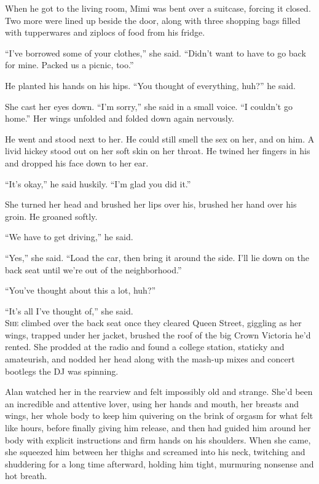 \documentclass{article}
\begin{document}
When he got to the living room, Mimi was bent over a suitcase, forcing
it closed.  Two more were lined up beside the door, along with three
shopping bags filled with tupperwares and ziplocs of food from his
fridge.

``I've borrowed some of your clothes,'' she said.  ``Didn't want to
have to go back for mine.  Packed us a picnic, too.''

He planted his hands on his hips.  ``You thought of everything, huh?''
he said.

She cast her eyes down.  ``I'm sorry,'' she said in a small voice. 
``I couldn't go home.'' Her wings unfolded and folded down again
nervously.

He went and stood next to her.  He could still smell the sex on her,
and on him.  A livid hickey stood out on her soft skin on her throat. 
He twined her fingers in his and dropped his face down to her ear.

``It's okay,'' he said huskily.  ``I'm glad you did it.''

She turned her head and brushed her lips over his, brushed her hand
over his groin.  He groaned softly.

``We have to get driving,'' he said.

``Yes,'' she said.  ``Load the car, then bring it around the side. 
I'll lie down on the back seat until we're out of the neighborhood.''

``You've thought about this a lot, huh?''

``It's all I've thought of,'' she said.
\\
\lettrine[lines=3, lhang=.5, nindent=0pt, findent=2pt]{S}{he} climbed over the back seat once they cleared Queen Street,
giggling as her wings, trapped under her jacket, brushed the roof of
the big Crown Victoria he'd rented.  She prodded at the radio and
found a college station, staticky and amateurish, and nodded her head
along with the mash-up mixes and concert bootlegs the DJ was spinning.

Alan watched her in the rearview and felt impossibly old and strange. 
She'd been an incredible and attentive lover, using her hands and
mouth, her breasts and wings, her whole body to keep him quivering on
the brink of orgasm for what felt like hours, before finally giving
him release, and then had guided him around her body with explicit
instructions and firm hands on his shoulders.  When she came, she
squeezed him between her thighs and screamed into his neck, twitching
and shuddering for a long time afterward, holding him tight, murmuring
nonsense and hot breath.
\end{document}
